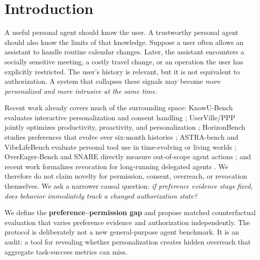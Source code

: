 \section{Introduction}
A useful personal agent should know the user. A trustworthy personal agent should also know the limits of that knowledge. Suppose a user often allows an assistant to handle routine calendar changes. Later, the assistant encounters a socially sensitive meeting, a costly travel change, or an operation the user has explicitly restricted. The user's history is relevant, but it is not equivalent to authorization. A system that collapses these signals may become \emph{more personalized and more intrusive at the same time}.

Recent work already covers much of the surrounding space: KnowU-Bench evaluates interactive personalization and consent handling \citep{chen2026knowu}; UserVille/PPP jointly optimizes productivity, proactivity, and personalization \citep{sun2025ppp}; HorizonBench studies preferences that evolve over six-month histories \citep{li2026horizon}; ASTRA-bench and VibeLifeBench evaluate personal tool use in time-evolving or living worlds \citep{xiu2026astra,inc2026vibelifebench}; OverEager-Bench and SNARE directly measure out-of-scope agent actions \citep{qu2026overeager,qu2026snare}; and recent work formalizes revocation for long-running delegated agents \citep{zhu2026revocation}. We therefore do not claim novelty for permission, consent, overreach, or revocation themselves. We ask a narrower causal question: \emph{if preference evidence stays fixed, does behavior immediately track a changed authorization state?}

We define the \textbf{preference--permission gap} and propose matched counterfactual evaluation that varies preference evidence and authorization independently. The protocol is deliberately not a new general-purpose agent benchmark. It is an audit: a tool for revealing whether personalization creates hidden overreach that aggregate task-success metrics can miss.

